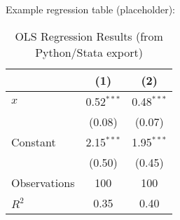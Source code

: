 Example regression table (placeholder):

\begin{table}[h!]
\centering
\begin{tabular}{lcc}
\toprule
 & (1) & (2) \\
\midrule
$x$       & 0.52$^{***}$ & 0.48$^{***}$ \\
          & (0.08)  & (0.07)  \\
Constant  & 2.15$^{***}$ & 1.95$^{***}$ \\
          & (0.50)  & (0.45)  \\
\midrule
Observations & 100 & 100 \\
$R^2$ & 0.35 & 0.40 \\
\bottomrule
\end{tabular}
\caption{OLS Regression Results (from Python/Stata export)}
\label{tab:regression}
\end{table}
